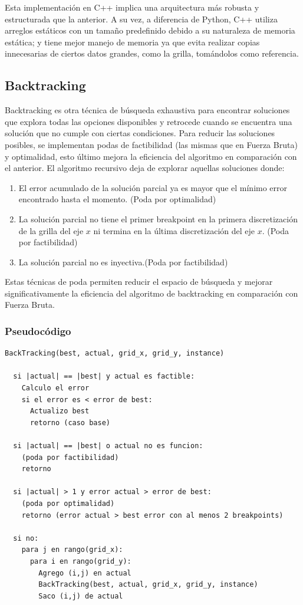 \documentclass{article}
\begin{document}
        Esta implementación en C++ implica una arquitectura más robusta y estructurada que la anterior. A su vez, a diferencia de Python, C++ utiliza arreglos estáticos con un tamaño predefinido debido a su naturaleza de memoria estática; y tiene mejor manejo de memoria ya que evita realizar copias innecesarias de ciertos datos grandes, como la grilla, tomándolos como referencia.
        

    \subsection{Backtracking}
    Backtracking es otra técnica de búsqueda exhaustiva para encontrar soluciones que explora todas las opciones disponibles y retrocede cuando se encuentra una solución que no cumple con ciertas condiciones. Para reducir las soluciones posibles, se implementan podas de factibilidad (las mismas que en Fuerza Bruta) y optimalidad, esto último mejora la eficiencia del algoritmo en comparación con el anterior. El algoritmo recursivo deja de explorar aquellas soluciones donde:
    
    \begin{enumerate}
            \item El error acumulado de la solución parcial ya es mayor que el mínimo error encontrado hasta el momento. (Poda por optimalidad)
            \item La solución parcial no tiene el primer breakpoint en la primera discretización de la grilla del eje $x$ ni termina en la última discretización del eje $x$. (Poda por factibilidad)
            \item La solución parcial no es inyectiva.(Poda por factibilidad)
        \end{enumerate}
    
   Estas técnicas de poda permiten reducir el espacio de búsqueda y mejorar significativamente la eficiencia del algoritmo de backtracking en comparación con Fuerza Bruta. 
   	
   	\subsubsection{Pseudocódigo}
   	
   	\begin{lstlisting}[language=pseudocode]
BackTracking(best, actual, grid_x, grid_y, instance)

  si |actual| == |best| y actual es factible:
    Calculo el error
    si el error es < error de best:
      Actualizo best
      retorno (caso base)

  si |actual| == |best| o actual no es funcion:
    (poda por factibilidad)
    retorno

  si |actual| > 1 y error actual > error de best:
    (poda por optimalidad)
    retorno (error actual > best error con al menos 2 breakpoints)

  si no:
    para j en rango(grid_x):
      para i en rango(grid_y):
        Agrego (i,j) en actual
        BackTracking(best, actual, grid_x, grid_y, instance)
        Saco (i,j) de actual
\end{lstlisting}
	
\end{document}
